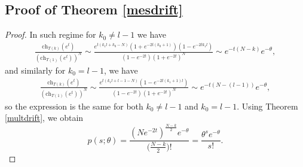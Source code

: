 \documentclass[11pt]{amsart}
\begin{document}
\subsection{Proof of Theorem \ref{mesdrift}}\label{poisproof2}
\begin{proof}
	In such regime for $k_0\neq l-1$ we have
	\begin{eqnarray*}
		\frac{\mathrm{ch}_{T(k)}(e^t)}{(\mathrm{ch}_{T(1)}(e^t))^N}\sim\frac{e^{t(k_1l+k_0-N)}(1+e^{-2t(k_0+1)})(1-e^{-2tk_1l})}{(1-e^{-2t})(1+e^{-2t})^N}\sim e^{-t(N-k)}e^{-\theta},
	\end{eqnarray*}
	and similarly for $k_0=l-1$, we have
	\begin{eqnarray*}
		\frac{\mathrm{ch}_{T(k)}(e^t)}{(\mathrm{ch}_{T(1)}(e^t))^N}\sim\frac{e^{t(k_1l+l-1-N)}(1-e^{-2t(k_1+1)l})}{(1-e^{-2t})(1+e^{-2t})^N}\sim e^{-t(N-(l-1))}e^{-\theta},
	\end{eqnarray*}
	so the expression is the same for both $k_0\neq l-1$ and $k_0= l-1$. Using Theorem \ref{multdrift}, we obtain
	\begin{equation*}
	p(s;\theta)=\frac{(Ne^{-2t})^{\frac{N-k}{2}}e^{-\theta}}{\big(\frac{N-k}{2}\big)!}=\frac{\theta^{s}e^{-\theta}}{s!}.
	\end{equation*}
\end{proof}
\end{document}
